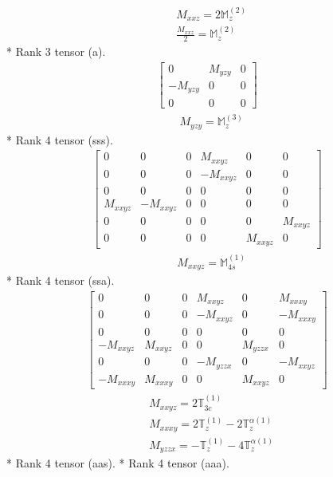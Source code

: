 \documentclass[fleqn,8pt,landscape]{jsarticle}
\begin{document}
\begin{align*}
& M_{xxz} = 2 \mathbb{M}_{z}^{(2)} \\
& \frac{M_{xxz}}{2} = \mathbb{M}_{z}^{(2)}
\end{align*}
* Rank 3 tensor (a).
\begin{align*}
\begin{bmatrix} 0 & M_{yzy} & 0 \\ - M_{yzy} & 0 & 0 \\ 0 & 0 & 0 \end{bmatrix}
\end{align*}
\begin{align*}
& M_{yzy} = \mathbb{M}_{z}^{(3)}
\end{align*}
* Rank 4 tensor (sss).
\begin{align*}
\begin{bmatrix} 0 & 0 & 0 & M_{xxyz} & 0 & 0 \\ 0 & 0 & 0 & - M_{xxyz} & 0 & 0 \\ 0 & 0 & 0 & 0 & 0 & 0 \\ M_{xxyz} & - M_{xxyz} & 0 & 0 & 0 & 0 \\ 0 & 0 & 0 & 0 & 0 & M_{xxyz} \\ 0 & 0 & 0 & 0 & M_{xxyz} & 0 \end{bmatrix}
\end{align*}
\begin{align*}
& M_{xxyz} = \mathbb{M}_{4s}^{(1)}
\end{align*}
* Rank 4 tensor (ssa).
\begin{align*}
\begin{bmatrix} 0 & 0 & 0 & M_{xxyz} & 0 & M_{xxxy} \\ 0 & 0 & 0 & - M_{xxyz} & 0 & - M_{xxxy} \\ 0 & 0 & 0 & 0 & 0 & 0 \\ - M_{xxyz} & M_{xxyz} & 0 & 0 & M_{yzzx} & 0 \\ 0 & 0 & 0 & - M_{yzzx} & 0 & - M_{xxyz} \\ - M_{xxxy} & M_{xxxy} & 0 & 0 & M_{xxyz} & 0 \end{bmatrix}
\end{align*}
\begin{align*}
& M_{xxyz} = 2 \mathbb{T}_{3c}^{(1)} \\
& M_{xxxy} = 2 \mathbb{T}_{z}^{(1)} - 2 \mathbb{T}_{z}^{\alpha(1)} \\
& M_{yzzx} = - \mathbb{T}_{z}^{(1)} - 4 \mathbb{T}_{z}^{\alpha(1)}
\end{align*}
* Rank 4 tensor (aas).
* Rank 4 tensor (aaa).
\end{document}
